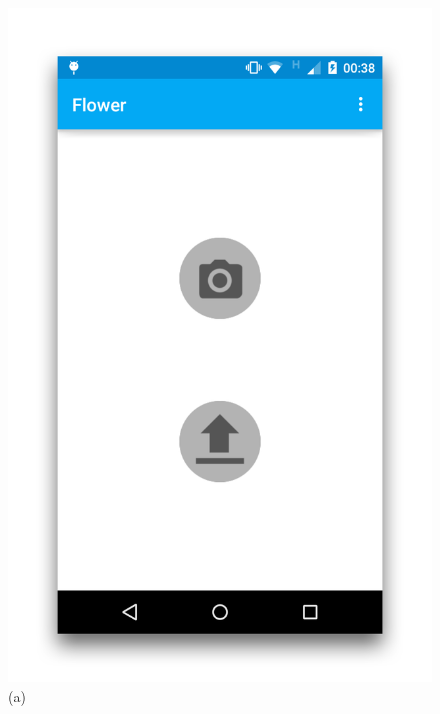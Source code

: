 \documentclass[11pt, a4paper]{report}
\begin{document}
\begin{figure}[h]
\centering
\begin{minipage}[b]{0.2\linewidth}
	\centering
	\includegraphics[totalheight=6cm]{img/39.png}
	(a)
\end{minipage}
\begin{minipage}[b]{0.2\linewidth}
	\centering

\end{minipage}
\end{figure}
\end{document}
